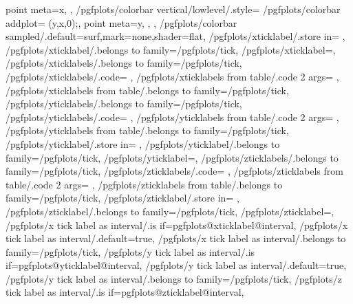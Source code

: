 {{{			point meta=x,
		},%
		/pgfplots/colorbar vertical/lowlevel/.style={%
			/pgfplots/colorbar addplot={ (y,x,0);},
			point meta=y,
		},%
	},%
	/pgfplots/colorbar sampled/.default={surf,mark=none,shader=flat},
	/pgfplots/xticklabel/.store in=	\pgfplots@xticklabel,
	/pgfplots/xticklabel/.belongs to family=/pgfplots/tick,
	/pgfplots/xticklabel=,
	/pgfplots/xticklabels/.belongs to family=/pgfplots/tick,
	/pgfplots/xticklabels/.code={%
		\pgfplotslistnew{}%
		\let\pgfplots@xticklabel=\pgfplots@user@ticklabel@list@x
	},
	/pgfplots/xticklabels from table/.code 2 args={%
		\to\pgfplots@xticklabels
		\let\pgfplots@xticklabel=\pgfplots@user@ticklabel@list@x
	},
	/pgfplots/xticklabels from table/.belongs to family=/pgfplots/tick,
	/pgfplots/yticklabels/.belongs to family=/pgfplots/tick,
	/pgfplots/yticklabels/.code={%
		\pgfplotslistnew{}%
		\let\pgfplots@yticklabel=\pgfplots@user@ticklabel@list@y
	},
	/pgfplots/yticklabels from table/.code 2 args={%
		\to\pgfplots@yticklabels
		\let\pgfplots@yticklabel=\pgfplots@user@ticklabel@list@y
	},
	/pgfplots/yticklabels from table/.belongs to family=/pgfplots/tick,
	/pgfplots/yticklabel/.store in=	\pgfplots@yticklabel,
	/pgfplots/yticklabel/.belongs to family=/pgfplots/tick,
	/pgfplots/yticklabel=,
	/pgfplots/zticklabels/.belongs to family=/pgfplots/tick,
	/pgfplots/zticklabels/.code={%
		\pgfplotslistnew{}%
		\let\pgfplots@zticklabel=\pgfplots@user@ticklabel@list@z
	},
	/pgfplots/zticklabels from table/.code 2 args={%
		\to\pgfplots@zticklabels
		\let\pgfplots@zticklabel=\pgfplots@user@ticklabel@list@z
	},
	/pgfplots/zticklabels from table/.belongs to family=/pgfplots/tick,
	/pgfplots/zticklabel/.store in=	\pgfplots@zticklabel,
	/pgfplots/zticklabel/.belongs to family=/pgfplots/tick,
	/pgfplots/zticklabel=,
	/pgfplots/x tick label as interval/.is if=pgfplots@xticklabel@interval,
	/pgfplots/x tick label as interval/.default=true,
	/pgfplots/x tick label as interval/.belongs to family=/pgfplots/tick,
	/pgfplots/y tick label as interval/.is if=pgfplots@yticklabel@interval,
	/pgfplots/y tick label as interval/.default=true,
	/pgfplots/y tick label as interval/.belongs to family=/pgfplots/tick,
	/pgfplots/z tick label as interval/.is if=pgfplots@zticklabel@interval,
}
